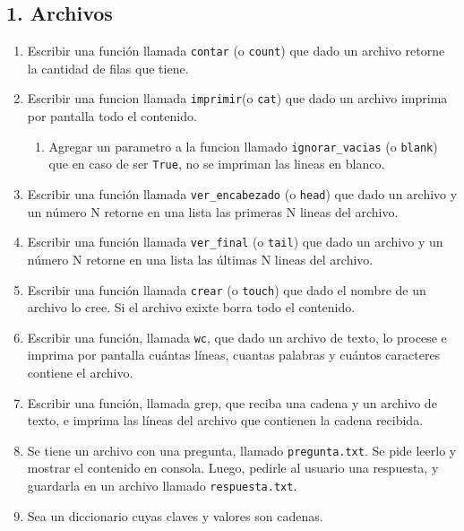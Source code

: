 \documentclass[
  letterpaper,
  DIV=11,
  numbers=noendperiod]{scrreprt}
\providecommand{\tightlist}{%
  \setlength{\itemsep}{0pt}\setlength{\parskip}{0pt}}\usepackage{longtable,booktabs,array}
\begin{document}

\subsection*{1. Archivos}\label{archivos-1}

\begin{enumerate}
\def\labelenumi{\arabic{enumi}.}
\item
  Escribir una función llamada \texttt{contar} (o \texttt{count}) que
  dado un archivo retorne la cantidad de filas que tiene.
\item
  Escribir una funcion llamada \texttt{imprimir}(o \texttt{cat}) que
  dado un archivo imprima por pantalla todo el contenido.

  \begin{enumerate}
  \def\labelenumii{\alph{enumii}.}
  \tightlist
  \item
    Agregar un parametro a la funcion llamado \texttt{ignorar\_vacias}
    (o \texttt{blank}) que en caso de ser \texttt{True}, no se impriman
    las lineas en blanco.
  \end{enumerate}
\item
  Escribir una función llamada \texttt{ver\_encabezado} (o
  \texttt{head}) que dado un archivo y un número N retorne en una lista
  las primeras N lineas del archivo.
\item
  Escribir una función llamada \texttt{ver\_final} (o \texttt{tail}) que
  dado un archivo y un número N retorne en una lista las últimas N
  lineas del archivo.
\item
  Escribir una función llamada \texttt{crear} (o \texttt{touch}) que
  dado el nombre de un archivo lo cree. Si el archivo exixte borra todo
  el contenido.
\item
  Escribir una función, llamada \texttt{wc}, que dado un archivo de
  texto, lo procese e imprima por pantalla cuántas líneas, cuantas
  palabras y cuántos caracteres contiene el archivo.
\item
  Escribir una función, llamada grep, que reciba una cadena y un archivo
  de texto, e imprima las líneas del archivo que contienen la cadena
  recibida.
\item
  Se tiene un archivo con una pregunta, llamado \texttt{pregunta.txt}.
  Se pide leerlo y mostrar el contenido en consola. Luego, pedirle al
  usuario una respuesta, y guardarla en un archivo llamado
  \texttt{respuesta.txt}.
\item
  Sea un diccionario cuyas claves y valores son cadenas.


\end{enumerate}
\end{document}
